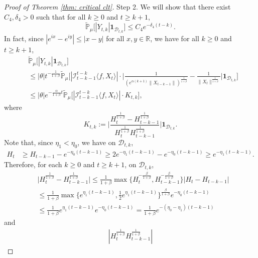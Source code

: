 \documentclass[12pt,a4paper]{amsart}
\theoremstyle{plain}
\theoremstyle{definition}
\numberwithin{equation}{section}
\begin{document}
\begin{proof}[Proof of Theorem \ref{thm: critical clt}]
    Step 2. We will show that there exist $C_4,\delta_4 > 0$ such that for all $k\geq 0$ and $t\geq k+1$,
\begin{equation}
\label{thm122}
    \mathbb{\widetilde{P}}_{\mu}\big[|Y_{t,k}|\mathbf{1}_{\mathcal{D}_{t,k}}\big]
    \leq  C_4 e^{-\delta_4 (t-k)}.
\end{equation}
    In fact, since $|e^{ix}-e^{iy}|\leq|x-y|$ for all $x,y\in \mathbb R$, we have for all $k \geq 0$ and $t\geq k+1$,
\begin{align}
\label{eq: control of Ykt}
    &\mathbb{\widetilde{P}}_{\mu}\big[|Y_{t,k}|\mathbf{1}_{\mathcal{D}_{t,k}}\big]
    \\&\leq|\theta|t^{-\frac{1}{1+\beta}} \mathbb{\widetilde{P}}_{\mu}\bigg[|\mathcal I_{t-k-1}^{t-k}\langle f ,X_t\rangle|\cdot\Big|\frac{1}{(e^{\alpha(k+1)}\|X_{t-k-1}\|)^{\frac{1}{1+\beta}}}-\frac{1}{\|X_t\|^{\frac{1}{1+\beta}}}\Big|\mathbf{1}_{\mathcal{D}_{t,k}}\bigg]
    \\&\leq |\theta| e^{-\frac{\alpha}{1+\beta}t}\mathbb{\widetilde{P}}_{\mu}\big[|\mathcal I_{t-k-1}^{t-k}\langle f ,X_t\rangle|\cdot K_{t,k}\big],
\end{align}
    where
\begin{equation}
\label{def: Ktk}
    K_{t,k}
    :=\Big|\frac{H_t^{\frac{1}{1+\beta}}-H_{t-k-1}^{\frac{1}{1+\beta}}}{H_t^{\frac{1}{1+\beta}}H_{t-k-1}^{\frac{1}{1+\beta}}}\Big|\mathbf{1}_{\mathcal{D}_{t,k}}.
\end{equation}
    Note that, since $\eta_1 < \eta_0$, we have on $\mathcal D_{t,k}$,
\begin{align}
    H_t
    &\geq H_{t-k-1}- e^{-\eta_0(t-k-1)}
    \geq 2e^{-\eta_1(t-k-1)}-e^{-\eta_0(t-k-1)}
    \geq e^{-\eta_1(t-k-1)}.
\end{align}
    Therefore, for each $k \geq 0$ and $t\geq k+1$,  on $\mathcal D_{t,k}$,
\begin{align}
    &\Big|H_t^{\frac{1}{1+\beta}}-H_{t-k-1}^{\frac{1}{1+\beta}}\Big|
    \leq \frac{1}{1+\beta}\max \Big\{H_t^{-\frac{\beta}{1+\beta}},H_{t-k-1}^{-\frac{\beta}{1+\beta}}\Big\}\left|H_t-H_{t-k-1}\right|
    \\&\leq \frac{1}{1+\beta} \max\{e^{\eta_1 (t-k-1)}, \frac{1}{2}e^{\eta_1(t-k-1)}\}^{\frac{\beta}{1+\beta}}e^{-\eta_0(t-k-1)}
    \\&\leq \frac{1}{1+\beta} e^{\eta_1 (t-k-1)} e^{-\eta_0(t-k-1)}
    =\frac{1}{1+\beta}  e^{-(\eta_0 - \eta_1)(t-k-1)}
\end{align}
    and
\begin{align}
    |H_t^{\frac{1}{1+\beta}}H_{t-k-1}^{\frac{1}{1+\beta}}|

\end{align}
\end{proof}
\end{document}
